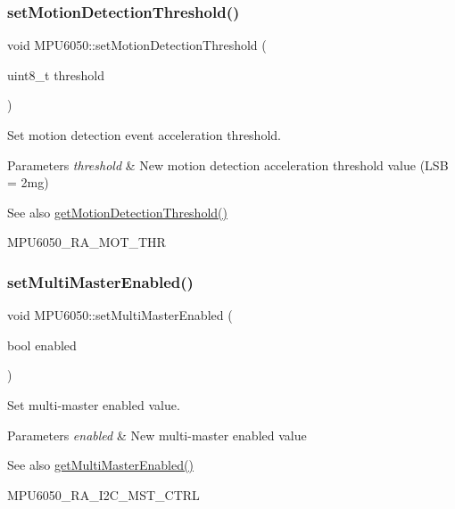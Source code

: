 \subsubsection{\texorpdfstring{setMotionDetectionThreshold()}{setMotionDetectionThreshold()}}
{\footnotesize\ttfamily void M\+P\+U6050\+::set\+Motion\+Detection\+Threshold (\begin{DoxyParamCaption}\item[{uint8\+\_\+t}]{threshold }\end{DoxyParamCaption})}

Set motion detection event acceleration threshold. 
\begin{DoxyParams}{Parameters}
{\em threshold} & New motion detection acceleration threshold value (L\+SB = 2mg) \\
\hline
\end{DoxyParams}
\begin{DoxySeeAlso}{See also}
\mbox{\hyperlink{class_m_p_u6050_ab7a825b1b8b86cebda308289630795e7}{get\+Motion\+Detection\+Threshold()}} 

M\+P\+U6050\+\_\+\+R\+A\+\_\+\+M\+O\+T\+\_\+\+T\+HR 
\end{DoxySeeAlso}
\mbox{\label{class_m_p_u6050_a039f5724974c5bf3f373ed9be031441c}} 
\subsubsection{\texorpdfstring{setMultiMasterEnabled()}{setMultiMasterEnabled()}}
{\footnotesize\ttfamily void M\+P\+U6050\+::set\+Multi\+Master\+Enabled (\begin{DoxyParamCaption}\item[{bool}]{enabled }\end{DoxyParamCaption})}

Set multi-\/master enabled value. 
\begin{DoxyParams}{Parameters}
{\em enabled} & New multi-\/master enabled value \\
\hline
\end{DoxyParams}
\begin{DoxySeeAlso}{See also}
\mbox{\hyperlink{class_m_p_u6050_aa88483068837bd9bc9c9f6c59a7a79b7}{get\+Multi\+Master\+Enabled()}} 

M\+P\+U6050\+\_\+\+R\+A\+\_\+\+I2\+C\+\_\+\+M\+S\+T\+\_\+\+C\+T\+RL 
\end{DoxySeeAlso}
\mbox{\label{class_m_p_u6050_a7d03801d6b656e8e12cd3c1dd97824a8}} 
